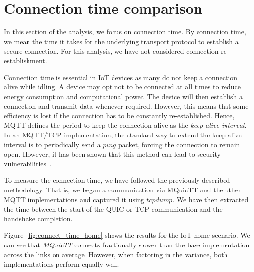 \section{Connection time comparison} \label{sec:conn_time}

In this section of the analysis, we focus on connection time.
By connection time, we mean the time it takes for the underlying transport protocol to establish a secure connection.
For this analysis, we have not considered connection re-establishment.

Connection time is essential in IoT devices as many do not keep a connection alive while idling.
A device may opt not to be connected at all times to reduce energy consumption and computational power.
The device will then establish a connection and transmit data whenever required.
However, this means that some efficiency is lost if the connection has to be constantly re-established.
Hence, MQTT defines the period to keep the connection alive as the \textit{keep alive interval}.
In an MQTT/TCP implementation, the standard way to extend the keep alive interval is to periodically send a $ping$ packet, forcing the connection to remain open.
However, it has been shown that this method can lead to security vulnerabilities~\citep{vaccari_slowtt_2020,mileva_comprehensive_2021}.

To measure the connection time, we have followed the previously described methodology.
That is, we began a communication via MQuicTT and the other MQTT implementations and captured it using $tcpdump$.
We have then extracted the time between the start of the QUIC or TCP communication and the handshake completion.

Figure~\ref{fig:connect_time_home} shows the results for the IoT home scenario.
We can see that $MQuicTT$ connects fractionally slower than the base implementation across the links on average.
However, when factoring in the variance, both implementations perform equally well.

